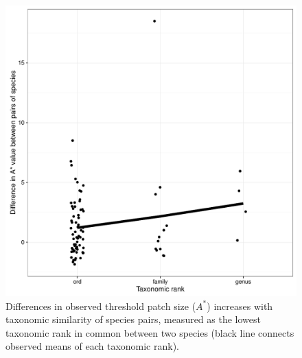 \begin{figure}[htbp]
\centering
\includegraphics[width=5.5in]{figures/astar.pdf}
\caption{Differences in observed
threshold patch size (\(A^{*}\)) increases with taxonomic similarity
of species pairs, measured as the lowest taxonomic rank in common
between two species (black line connects observed means of each
taxonomic rank).}
\end{figure}

